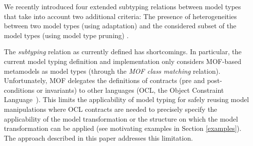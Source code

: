 We recently introduced four extended subtyping relations between model types that take into account two additional criteria: The presence of heterogeneities between two model types (using adaptation) and the considered subset of the model types (using model type pruning) \cite{ecmfa12}.

The \emph{subtyping} relation as currently defined has shortcomings. 
In particular, the current model typing definition and implementation only considers MOF-based metamodels as model types (through the \emph{MOF class matching} relation). Unfortunately, MOF delegates the definitions of contracts (\eg pre and post-conditions or invariants) to other languages (\eg OCL, the Object Constraint Language~\cite{OCL}). 
This limits the applicability of model typing for safely reusing model manipulations where OCL contracts are needed to precisely specify the applicability of the model transformation or the structure on which the model transformation can be applied (see motivating examples in Section \ref{examples}). The approach described in this paper addresses this limitation.
